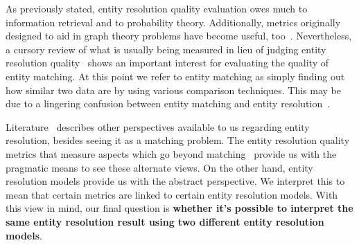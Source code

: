 As previously stated, entity resolution quality evaluation owes much to
information retrieval and to probability theory.
Additionally, metrics originally designed to aid in graph theory problems have
become useful, too~\cite{hitesh2012,Kon19}.
Nevertheless, a cursory review of what is usually being measured in lieu of
judging entity resolution quality~\cite{fever2009,Men10,Goga2015} shows an
important interest for evaluating the quality of entity matching.
At this point we refer to entity matching as simply finding out how similar two
data are by using various comparison techniques.
This may be due to a lingering confusion between entity matching and entity
resolution~\cite{Tal11}.

Literature~\cite{Tal11} describes other perspectives available to us regarding
entity resolution, besides seeing it as a matching problem.
The entity resolution quality metrics that measure aspects which go beyond
matching~\cite{Men10,tal2007algebraic} provide us with the pragmatic means to
see these alternate views.
On the other hand, entity resolution models\cite{Ben2009Swoosh,Tal11,fs1969}
provide us with the abstract perspective.
We interpret this to mean that certain metrics are linked to certain entity
resolution models.
With this view in mind, our final question is \textbf{whether it's possible to
interpret the same entity resolution result using two different entity
resolution models}.
